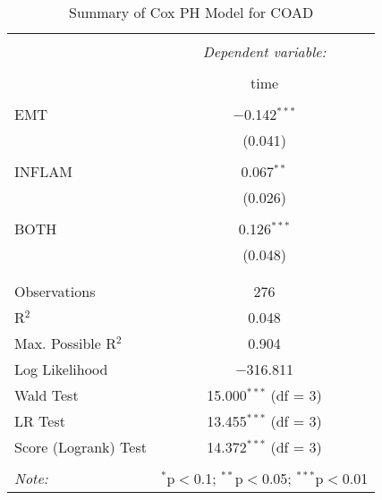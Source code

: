 
\begin{table}[!htbp] \centering 
  \caption{Summary of Cox PH Model for COAD} 
  \label{table:COAD_cph} 
\begin{tabular}{@{\extracolsep{5pt}}lc} 
\\[-1.8ex]\hline 
\hline \\[-1.8ex] 
 & \multicolumn{1}{c}{\textit{Dependent variable:}} \\ 
\cline{2-2} 
\\[-1.8ex] & time \\ 
\hline \\[-1.8ex] 
 EMT & $-$0.142$^{***}$ \\ 
  & (0.041) \\ 
  & \\ 
 INFLAM & 0.067$^{**}$ \\ 
  & (0.026) \\ 
  & \\ 
 BOTH & 0.126$^{***}$ \\ 
  & (0.048) \\ 
  & \\ 
\hline \\[-1.8ex] 
Observations & 276 \\ 
R$^{2}$ & 0.048 \\ 
Max. Possible R$^{2}$ & 0.904 \\ 
Log Likelihood & $-$316.811 \\ 
Wald Test & 15.000$^{***}$ (df = 3) \\ 
LR Test & 13.455$^{***}$ (df = 3) \\ 
Score (Logrank) Test & 14.372$^{***}$ (df = 3) \\ 
\hline 
\hline \\[-1.8ex] 
\textit{Note:}  & \multicolumn{1}{r}{$^{*}$p$<$0.1; $^{**}$p$<$0.05; $^{***}$p$<$0.01} \\ 
\end{tabular} 
\end{table} 
